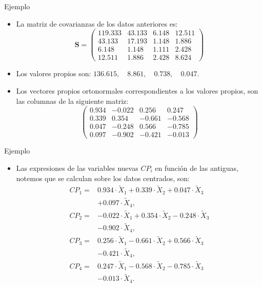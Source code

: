 \documentclass[
  spanish,
  ignorenonframetext,
]{beamer}
\providecommand{\tightlist}{%
  \setlength{\itemsep}{0pt}\setlength{\parskip}{0pt}}
\begin{document}
\begin{frame}{Ejemplo}
\protect\hypertarget{ejemplo-2}{}
\begin{itemize}
\item
  La matriz de covarianzas de los datos anteriores es: \[
  \mathbf{S}=
  \left(
  \begin{array}{rrrr}
  119.333 & 43.133 & 6.148 & 12.511 \\
   43.133 & 17.193 & 1.148 & 1.886 \\
   6.148 & 1.148 & 1.111 & 2.428 \\
   12.511 & 1.886 & 2.428 & 8.624 
  \end{array}
  \right)
  \]
\item
  Los valores propios son:
  \(136.615,\quad 8.861,\quad 0.738,\quad 0.047.\)
\item
  Los vectores propios ortonormales correspondientes a los valores
  propios, son las columnas de la siguiente matriz: \[
  \left(
  \begin{array}{rrrr}
  0.934 & -0.022 & 0.256 & 0.247 \\
  0.339 & 0.354 & -0.661 & -0.568 \\
  0.047 & -0.248 & 0.566 & -0.785 \\
  0.097 & -0.902 & -0.421 & -0.013
  \end{array}
  \right)
  \]
\end{itemize}
\end{frame}

\begin{frame}{Ejemplo}
\protect\hypertarget{ejemplo-3}{}
\begin{itemize}
\tightlist
\item
  Las expresiones de las variables nuevas \(CP_i\) en función de las
  antiguas, notemos que se calculan sobre los datos centrados, son: \[
  \begin{array}{rl}
  CP_1 = & 0.934\cdot \tilde{X}_1 + 0.339\cdot \tilde{X}_2 + 0.047\cdot
  \tilde{X}_3  \\ & + 0.097 \cdot \tilde{X}_4, \\
  CP_2 = & -0.022\cdot \tilde{X}_1 +0.354\cdot \tilde{X}_2 -0.248 \cdot
  \tilde{X}_3 \\ & -0.902 \cdot \tilde{X}_4, \\
  CP_3 = & 0.256\cdot \tilde{X}_1 -0.661 \cdot \tilde{X}_2 +0.566\cdot \tilde{X}_3
  \\ &  -0.421\cdot \tilde{X}_4, \\
  CP_4 = & 0.247 \cdot \tilde{X}_1 - 0.568\cdot \tilde{X}_2 - 0.785\cdot
  \tilde{X}_3 \\ & - 0.013 \cdot \tilde{X}_4.
  \end{array}
  \]
\end{itemize}
\end{frame}
\end{document}
